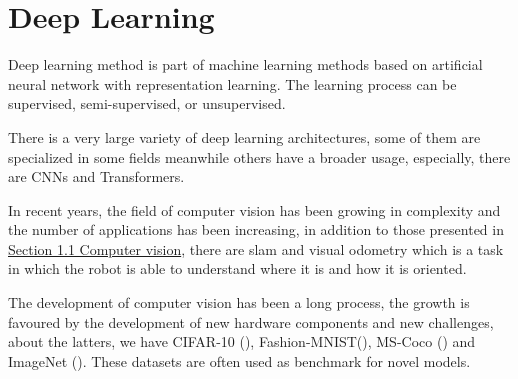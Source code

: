 \section{Deep Learning}\label{sec:deep-learning}

Deep learning method is part of machine learning methods based on artificial neural network with representation learning.
The learning process can be supervised, semi-supervised, or unsupervised.

There is a very large variety of deep learning architectures, some of them are specialized in some fields meanwhile others have a broader usage, especially, there are CNNs and Transformers.

In recent years, the field of computer vision has been growing in complexity and the number of applications has been increasing, in addition to those presented in \hyperref[sec:background]{Section 1.1 Computer vision}, there are \gls{slam} and visual odometry which is a task in which the robot is able to understand where it is and how it is oriented.

The development of computer vision has been a long process, the growth is favoured by the development of new hardware components and new challenges, about the latters, we have
CIFAR-10 (\cite{cifar10_paper}), Fashion-MNIST(\cite{fashion_mnist_paper}), MS-Coco (\cite{ms_coco_paper}) and ImageNet (\cite{imagenet_paper}).
These datasets are often used as benchmark for novel models.

